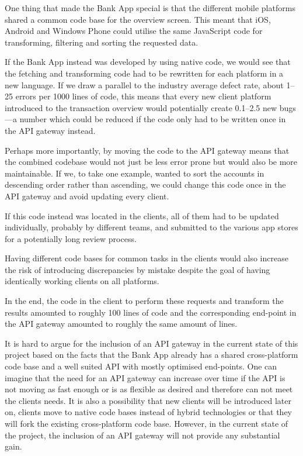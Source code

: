 \documentclass{cslthse-msc}
\begin{document}
One thing that made the Bank App special is that the different mobile platforms shared a common code base for the overview screen. This meant that iOS, Android and Windows Phone could utilise the same JavaScript code for transforming, filtering and sorting the requested data.

If the Bank App instead was developed by using native code, we would see that the fetching and transforming code had to be rewritten for each platform in a new language. If we draw a parallel to the industry average defect rate, about 1--25 errors per 1000 lines of code\cite{code_complete}, this means that every new client platform introduced to the transaction overview would potentially create 0.1--2.5 new bugs---a number which could be reduced if the code only had to be written once in the API gateway instead.

Perhaps more importantly, by moving the code to the API gateway means that the combined codebase would not just be less error prone but would also be more maintainable. If we, to take one example, wanted to sort the accounts in descending order rather than ascending, we could change this code once in the API gateway and avoid updating every client. 

If this code instead was located in the clients, all of them had to be updated individually, probably by different teams, and submitted to the various app stores for a potentially long review process.

Having different code bases for common tasks in the clients would also increase the risk of introducing discrepancies by mistake despite the goal of having identically working clients on all platforms.

In the end, the code in the client to perform these requests and transform the results amounted to roughly 100 lines of code and the corresponding end-point in the API gateway amounted to roughly the same amount of lines.

It is hard to argue for the inclusion of an API gateway in the current state of this project based on the facts that the Bank App already has a shared cross-platform code base and a well suited API with mostly optimised end-points. One can imagine that the need for an API gateway can increase over time if the API is not moving as fast enough or is as flexible as desired and therefore can not meet the clients needs. It is also a possibility that new clients will be introduced later on, clients move to native code bases instead of hybrid technologies or that they will fork the existing cross-platform code base. However, in the current state of the project, the inclusion of an API gateway will not provide any substantial gain.
\end{document}
